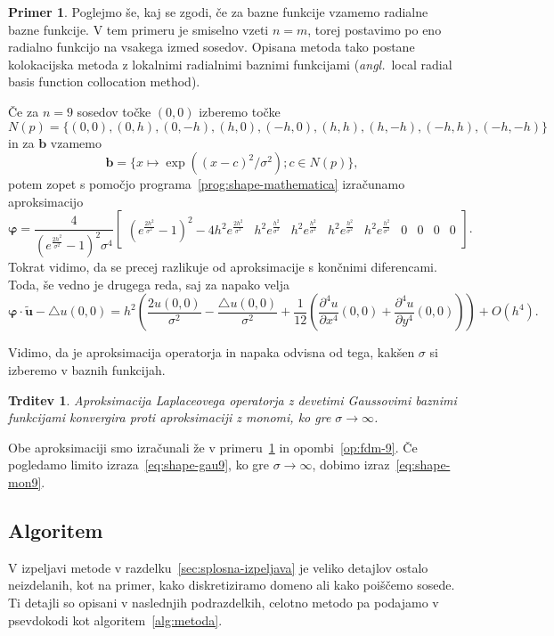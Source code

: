 \documentclass[a4paper,twoside]{article}
\theoremstyle{definition} %
\newtheorem{primer}[definicija]{Primer}
\theoremstyle{plain} %
\newtheorem{trditev}[definicija]{Trditev}
\numberwithin{equation}{section}
\renewcommand{\b}{\boldsymbol}
\renewcommand{\phi}{\varphi}
\newcommand{\dpar}[2]{\ensuremath{\frac{\partial #1}{\partial #2}}}
\newcommand{\ang}[1]{(\textit{angl.}\ #1)}
\begin{document}
\begin{primer}
\label{prim:rbf}
Poglejmo še, kaj se zgodi, če za bazne funkcije vzamemo radialne bazne funkcije.
V tem primeru je smiselno vzeti $n = m$, torej postavimo po eno radialno funkcijo
na vsakega izmed sosedov. Opisana metoda tako postane kolokacijska metoda z
lokalnimi radialnimi baznimi funkcijami \ang{local radial basis function
collocation method}.

Če za $n = 9$ sosedov točke $(0, 0)$ izberemo točke \[ N(p) = \{
  (0, 0), (0, h), (0, -h), (h, 0), (-h, 0), (h, h), (h, -h), (-h, h), (-h, -h)
\} \] in za $\b b$ vzamemo \[ \b b = \{ x\mapsto \exp((x-c)^2/\sigma^2); c \in N(p)
\}, \]
potem zopet s
pomočjo programa~\ref{prog:shape-mathematica} izračunamo aproksimacijo
\small
\begin{equation}
  \b\phi =\frac{4}{(e^{\frac{2 h^2}{\sigma^2 }}-1)^2 \sigma^4}
\begin{bmatrix}
  (e^{\frac{2 h^2}{\sigma^2 }}-1)^2 -4h^2 e^{\frac{2 h^2}{\sigma^2 }} &
   h^2e^{\frac{h^2}{\sigma^2 }} & h^2e^{\frac{h^2}{\sigma^2 }} &
   h^2e^{\frac{h^2}{\sigma^2 }} & h^2e^{\frac{h^2}{\sigma^2 }} & 0 & 0 & 0 & 0
 \end{bmatrix}.
  \label{eq:shape-gau9}
\end{equation}
\normalsize
Tokrat vidimo, da se precej razlikuje od aproksimacije s končnimi diferencami.
Toda, še vedno je drugega reda, saj za napako velja
\[
  \b \phi\cdot \b{\tilde{u}} - \triangle u(0, 0) =
  h^2\left(\frac{2u(0,0)}{\sigma^2} - \frac{\triangle u(0,0)}{\sigma^2} +
  \frac{1}{12}\left( \dpar{^4u}{x^4}(0,0) + \dpar{^4u}{y^4}(0, 0) \right)\right)
  + O(h^4).
\]
\end{primer}

Vidimo, da je aproksimacija operatorja in napaka odvisna od tega, kakšen
$\sigma$ si izberemo v baznih funkcijah.
\begin{trditev}
  \label{trd:rbf-konv-k-mon}
  Aproksimacija Laplaceovega operatorja z devetimi Gaussovimi baznimi funkcijami
  konvergira proti aproksimaciji z monomi, ko gre $\sigma \to \infty$.
\end{trditev}
\proof
  Obe aproksimaciji smo izračunali že v primeru~\ref{prim:rbf} in
  opombi~\ref{op:fdm-9}. Če pogledamo limito izraza~\eqref{eq:shape-gau9},
  ko gre $\sigma \to \infty$, dobimo izraz~\eqref{eq:shape-mon9}.
\endproof

\subsection{Algoritem}
V izpeljavi metode v razdelku~\ref{sec:splosna-izpeljava} je veliko detajlov
ostalo neizdelanih, kot na primer, kako diskretiziramo domeno ali kako poiščemo
sosede. Ti detajli so opisani v naslednjih podrazdelkih, celotno metodo pa podajamo v
psevdokodi kot algoritem~\ref{alg:metoda}.
\end{document}
